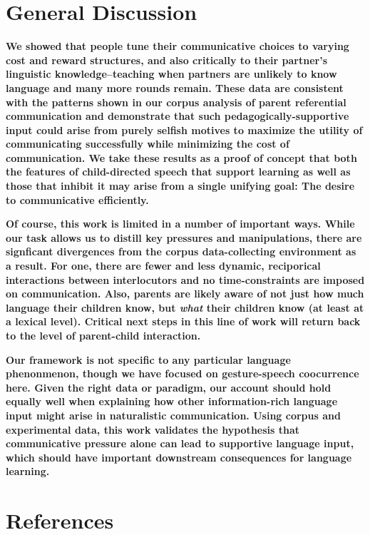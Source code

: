 \documentclass[10pt, letterpaper]{article}
\begin{document}
\section{General Discussion}\label{general-discussion}

\textbf{We showed that people tune their communicative choices to
varying cost and reward structures, and also critically to their
partner's linguistic knowledge--teaching when partners are unlikely to
know language and many more rounds remain. These data are consistent
with the patterns shown in our corpus analysis of parent referential
communication and demonstrate that such pedagogically-supportive input
could arise from purely selfish motives to maximize the utility of
communicating successfully while minimizing the cost of communication.
We take these results as a proof of concept that both the features of
child-directed speech that support learning as well as those that
inhibit it may arise from a single unifying goal: The desire to
communicative efficiently. }

\textbf{Of course, this work is limited in a number of important ways.
While our task allows us to distill key pressures and manipulations,
there are signficant divergences from the corpus data-collecting
environment as a result. For one, there are fewer and less dynamic,
reciporical interactions between interlocutors and no time-constraints
are imposed on communication. Also, parents are likely aware of not just
how much language their children know, but \emph{what} their children
know (at least at a lexical level). Critical next steps in this line of
work will return back to the level of parent-child interaction.}

\textbf{Our framework is not specific to any particular language
phenonmenon, though we have focused on gesture-speech coocurrence here.
Given the right data or paradigm, our account should hold equally well
when explaining how other information-rich language input might arise in
naturalistic communication. Using corpus and experimental data, this
work validates the hypothesis that communicative pressure alone can lead
to supportive language input, which should have important downstream
consequences for language learning.}

\section{References}\label{references}

\setlength{\parindent}{-0.1in} \setlength{\leftskip}{0.125in}
\end{document}
